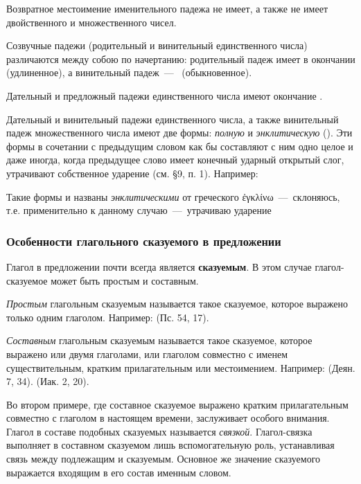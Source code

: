 \documentclass[11pt,a4paper,oneside]{memoir}
\begin{document}
    \bigskip
    Возвратное местоимение {} именительного падежа не имеет, а также не имеет двойственного и множественного чисел.
    
    Созвучные падежи (родительный и винительный единственного числа) различаются между собою по начертанию: родительный падеж имеет в окончании {} (удлиненное), а винительный падеж~---~{} (обыкновенное).
    
    Дательный и предложный падежи единственного числа имеют окончание {}.
    
    Дательный и винительный падежи единственного числа, а также винительный падеж множественного числа имеют две формы: \emph{полную} и \emph{энклитическую} ({}). Эти формы в сочетании с предыдущим словом как бы составляют с ним одно целое и даже иногда, когда предыдущее слово имеет конечный ударный открытый слог, утрачивают собственное ударение (см. \S9, п. 1). Например: {}
    
    Такие формы и названы \emph{энклитическими} от греческого \textgreek{ἐγκλίνω}~---~склоняюсь, т.е. применительно к данному случаю~---~утрачиваю ударение

                \subsubsection{Особенности глагольного сказуемого в предложении}

    Глагол в предложении почти всегда является \textbf{сказуемым}. В этом случае глагол-сказуемое может быть простым и составным.
    
    \emph{Простым} глагольным сказуемым называется такое сказуемое, которое выражено только одним глаголом. Например: {} (Пс. 54, 17).
    
    \emph{Составным} глагольным сказуемым называется такое сказуемое, которое выражено или двумя глаголами, или глаголом совместно с именем существительным, кратким прилагательным или местоимением. Например: {} (Деян. 7, 34). {} (Иак. 2, 20).
    
    Во втором примере, где составное сказуемое выражено кратким прилагательным совместно с глаголом {} в настоящем времени, заслуживает особого внимания. Глагол {} в составе подобных сказуемых называется \emph{связкой}. Глагол-связка выполняет в составном сказуемом лишь вспомогательную роль, устанавливая связь между подлежащим и сказуемым. Основное же значение сказуемого выражается входящим в его состав именным словом.
    
\end{document}
